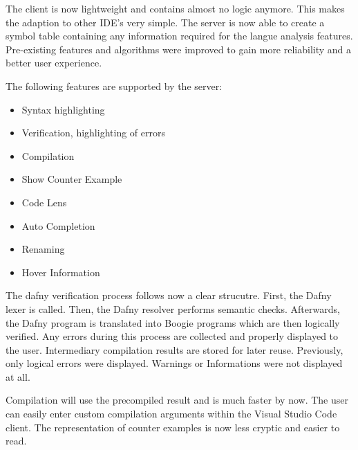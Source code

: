 The client is now lightweight and contains almost no logic anymore.
This makes the adaption to other IDE's very simple.
The server is now able to create a symbol table containing any information required for the langue analysis features.
Pre-existing features and algorithms were improved to gain more reliability and a better user experience.

The following features are supported by the server:
\begin{itemize}
    \item Syntax highlighting
    \item Verification, highlighting of errors
    \item Compilation
    \item Show Counter Example
    \item Code Lens
    \item Auto Completion
    \item Renaming
    \item Hover Information
\end{itemize}




The dafny verification process follows now a clear strucutre.
First, the Dafny lexer is called.
Then, the Dafny resolver performs semantic checks.
Afterwards, the Dafny program is translated into Boogie programs which are then logically verified.
Any errors during this process are collected and properly displayed to the user.
Intermediary compilation results are stored for later reuse.
Previously, only logical errors were displayed.
Warnings or Informations were not displayed at all.

Compilation will use the precompiled result and is much faster by now.
The user can easily enter custom compilation arguments within the Visual Studio Code client.
The representation of counter examples is now less cryptic and easier to read.\\

